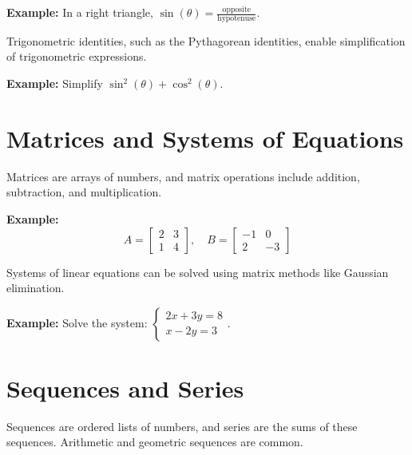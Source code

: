 \documentclass{article}
\begin{document}
\begin{framed}
\textbf{Example:}
In a right triangle, \(\sin(\theta) = \frac{\text{opposite}}{\text{hypotenuse}}\).
\end{framed}

Trigonometric identities, such as the Pythagorean identities, enable simplification of trigonometric expressions.

\begin{framed}
\textbf{Example:}
Simplify \(\sin^2(\theta) + \cos^2(\theta)\).
\end{framed}


\section{Matrices and Systems of Equations}
Matrices are arrays of numbers, and matrix operations include addition, subtraction, and multiplication.

\begin{framed}
\textbf{Example:}
\[ A = \begin{bmatrix} 2 & 3 \\ 1 & 4 \end{bmatrix}, \quad B = \begin{bmatrix} -1 & 0 \\ 2 & -3 \end{bmatrix} \]
\end{framed}

Systems of linear equations can be solved using matrix methods like Gaussian elimination.

\begin{framed}
\textbf{Example:}
Solve the system: \(\begin{cases} 2x + 3y = 8 \\ x - 2y = 3 \end{cases}\).
\end{framed}

\section{Sequences and Series}
Sequences are ordered lists of numbers, and series are the sums of these sequences. Arithmetic and geometric sequences are common.
\end{document}
